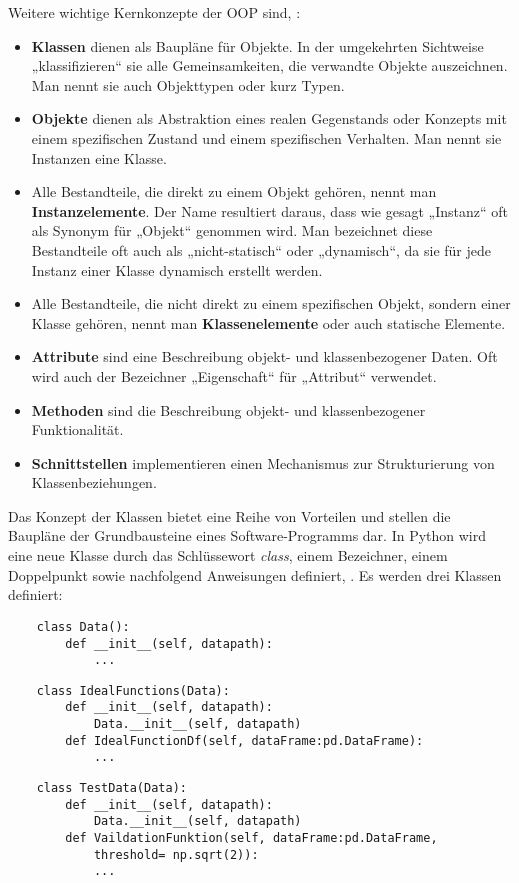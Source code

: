 Weitere wichtige Kernkonzepte der OOP sind, \cite{Steyer:2018}:
\begin{itemize}
	\itemsep0pt
	\item \textbf{Klassen} dienen als Baupläne für Objekte. In der umgekehrten Sichtweise „klassifizieren“ sie alle Gemeinsamkeiten, die verwandte Objekte auszeichnen. Man nennt sie auch Objekttypen oder kurz Typen.
	\item \textbf{Objekte} dienen als Abstraktion eines realen Gegenstands oder Konzepts mit einem spezifischen Zustand und einem spezifischen Verhalten. Man nennt sie Instanzen eine Klasse.
	\item Alle Bestandteile, die direkt zu einem Objekt gehören, nennt man \textbf{Instanzelemente}. Der Name resultiert daraus, dass wie gesagt „Instanz“ oft als Synonym für „Objekt“ genommen wird. Man bezeichnet diese Bestandteile oft auch als „nicht-statisch“ oder „dynamisch“, da sie für jede Instanz einer Klasse dynamisch erstellt werden.
	\item Alle Bestandteile, die nicht direkt zu einem spezifischen Objekt, sondern einer Klasse gehören, nennt man \textbf{Klassenelemente} oder auch statische Elemente.
	\item \textbf{Attribute} sind eine Beschreibung objekt- und klassenbezogener Daten. Oft wird auch der Bezeichner „Eigenschaft“ für „Attribut“ verwendet.
	\item \textbf{Methoden} sind die Beschreibung objekt- und klassenbezogener Funktionalität.
	\item \textbf{Schnittstellen} implementieren einen Mechanismus zur Strukturierung von Klassenbeziehungen.
\end{itemize}

Das Konzept der Klassen bietet eine Reihe von Vorteilen und stellen die Baupläne der Grundbausteine eines Software-Programms dar.
In Python wird eine neue Klasse durch das Schlüssewort \textit{class}, einem Bezeichner, einem Doppelpunkt sowie nachfolgend Anweisungen definiert, \cite{Steyer:2018}.
Es werden drei Klassen definiert:
\begin{lstlisting}
	class Data():
		def __init__(self, datapath):
			...
\end{lstlisting}
\begin{lstlisting}
	class IdealFunctions(Data):
		def __init__(self, datapath):
			Data.__init__(self, datapath)
		def IdealFunctionDf(self, dataFrame:pd.DataFrame):
			...
\end{lstlisting}
\begin{lstlisting}
	class TestData(Data):
		def __init__(self, datapath):
			Data.__init__(self, datapath)
		def VaildationFunktion(self, dataFrame:pd.DataFrame, 
			threshold= np.sqrt(2)):
			...
\end{lstlisting}

